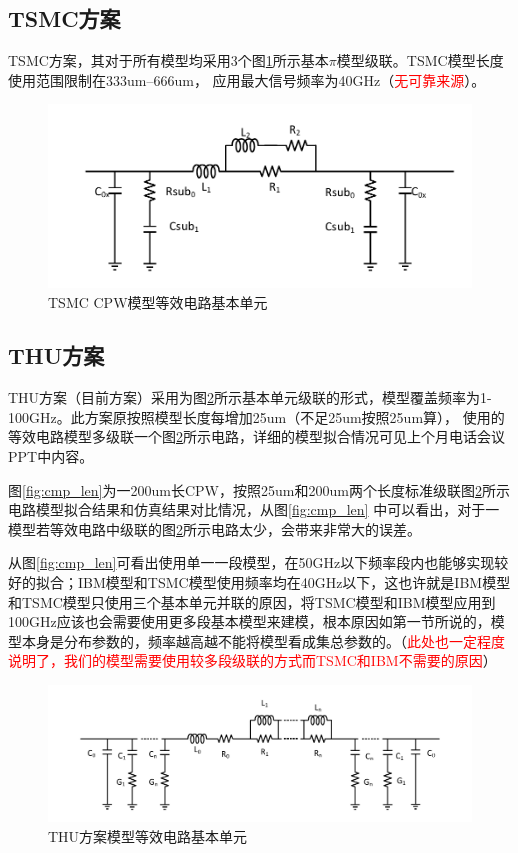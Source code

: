 \documentclass[UTF8,a4paper,zihao=-4]{ctexart}
\begin{document}
\subsection{TSMC方案}
TSMC方案，其对于所有模型均采用3个图\ref{fig:TSMC_model}所示基本$\pi$模型级联。TSMC模型长度使用范围限制在333um--666um，
应用最大信号频率为40GHz（{\textcolor{red}{无可靠来源}}）。
\begin{figure}[htb]
  \centering
  \includegraphics[width=12 cm]{tsmc_cpw.pdf}
  \caption{TSMC CPW模型等效电路基本单元} \label{fig:TSMC_model}
\end{figure}

\subsection{THU方案}
THU方案（目前方案）采用为图\ref{fig:my_model}所示基本单元级联的形式，模型覆盖频率为1-100GHz。此方案原按照模型长度每增加25um（不足25um按照25um算），
使用的等效电路模型多级联一个图\ref{fig:my_model}所示电路，详细的模型拟合情况可见上个月电话会议PPT中内容。
\par
图\ref{fig:cmp_len}为一200um长CPW，按照25um和200um两个长度标准级联图\ref{fig:my_model}所示电路模型拟合结果和仿真结果对比情况，从图\ref{fig:cmp_len}
中可以看出，对于一模型若等效电路中级联的图\ref{fig:my_model}所示电路太少，会带来非常大的误差。
\par
从图\ref{fig:cmp_len}可看出使用单一一段模型，在50GHz以下频率段内也能够实现较好的拟合；IBM模型和TSMC模型使用频率均在40GHz以下，这也许就是IBM模型和TSMC模型只使用三个基本单元并联的原因，将TSMC模型和IBM模型应用到100GHz应该也会需要使用更多段基本模型来建模，根本原因如第一节所说的，模型本身是分布参数的，频率越高越不能将模型看成集总参数的。（{\textcolor{red}{此处也一定程度说明了，我们的模型需要使用较多段级联的方式而TSMC和IBM不需要的原因}}）
\begin{figure}[htb]
  \centering
  \includegraphics[width=12 cm]{my_model.pdf}
  \caption{THU方案模型等效电路基本单元} \label{fig:my_model}
\end{figure}
\end{document}
